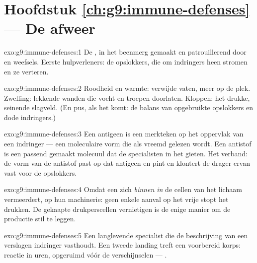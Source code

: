 \section*{Hoofdstuk \ref{ch:g9:immune-defenses} --- De afweer}

\begin{solution}{exo:g9:immune-defenses:1}
De , in het beenmerg gemaakt en patrouillerend
door  en weefsels. Eerste hulpverleners: de opslokkers, die om
indringers heen stromen en ze verteren.
\end{solution}

\begin{solution}{exo:g9:immune-defenses:2}
Roodheid en warmte: verwijde vaten, meer  op de plek.
Zwelling: lekkende wanden die vocht en troepen doorlaten. Kloppen:
het drukke, seinende slagveld. (En pus, als het komt: de balans van
opgebruikte opslokkers en dode indringers.)
\end{solution}

\begin{solution}{exo:g9:immune-defenses:3}
Een antigeen is een merkteken op het oppervlak van een indringer
--- een moleculaire vorm die als vreemd gelezen wordt. Een antistof
is een passend gemaakt molecuul dat de specialisten in het 
gieten. Het verband: de vorm van de antistof past op dat antigeen
en pint en klontert de drager ervan vast voor de opslokkers.
\end{solution}

\begin{solution}{exo:g9:immune-defenses:4}
Omdat een  zich \emph{binnen in} de cellen van het lichaam
vermeerdert, op hun machinerie: geen enkele aanval op het vrije
 stopt het drukken. De gekaapte drukperscellen vernietigen is
de enige manier om de productie stil te leggen.
\end{solution}

\begin{solution}{exo:g9:immune-defenses:5}
Een langlevende specialist die de beschrijving van een verslagen
indringer vasthoudt. Een tweede landing treft een voorbereid korps:
reactie in uren, opgeruimd vóór de verschijnselen --- .
\end{solution}

